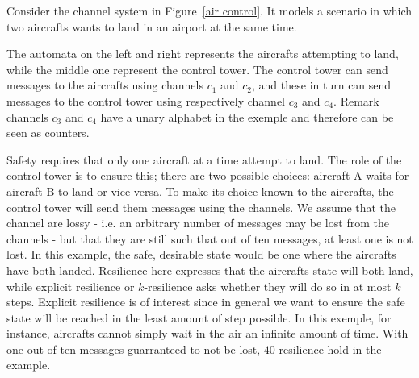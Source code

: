 Consider the channel system in Figure~\ref{air control}. It models a scenario in which two aircrafts wants to land in an airport at the same time. 

The automata on the left and right represents the aircrafts attempting to land, while the middle one represent the control tower. The control tower can send messages to the aircrafts using channels $c_1$ and $c_2$, and these in turn can send messages to the control tower using respectively channel $c_3$ and $c_4$. Remark channels $c_3$ and $c_4$ have a unary alphabet
in the exemple and therefore can be seen as counters. 

Safety requires that only one aircraft at a time attempt to land. The role of the control tower is to ensure this;
there are two possible choices: aircraft A waits for aircraft B to land
or vice-versa. To make its choice known to the aircrafts, the control tower will send them messages using the channels. 
We assume that the channel are
lossy \-- i.e. an arbitrary number of messages may be lost from the channels \--  but that they are still such that out of ten messages, at least one is not lost.
In this example, the safe, desirable state would be one where the aircrafts have both landed. 
Resilience here expresses that the aircrafts state will both land, while explicit resilience or $k$-resilience asks whether they will do so in at most $k$ steps. 
Explicit resilience is of interest since in general we want to ensure the safe state will
be reached in
the least amount of step possible. 
In this exemple, for instance, aircrafts cannot simply wait in the air an infinite amount of time.
With one out of ten messages guarranteed to not be lost, $40$-resilience hold in the example.





